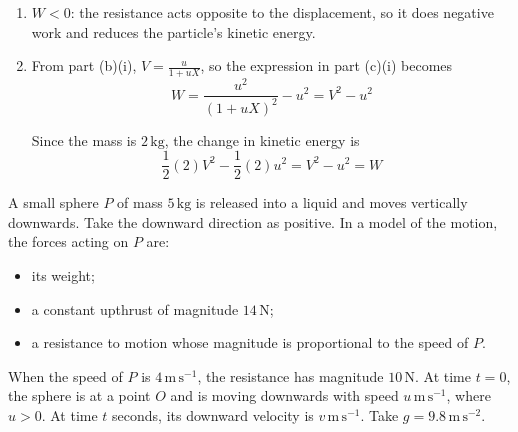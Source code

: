 \documentclass[leqno]{article}
\begin{document}
\begin{enumerate}[
  label=\textbf{\arabic*.},
  leftmargin=*,
  topsep=0pt,
  partopsep=0pt,
  parsep=0pt
]
\begin{djsSolution}
\begin{enumerate}[label=\textbf{(\alph*)}, start=1]
\begin{enumerate}[label=(\roman*), start=1]
    \item \(W<0\): the resistance acts opposite to the displacement, so it does negative work and reduces the particle's kinetic energy.

    \item From part (b)(i), \(V=\frac{u}{1+uX}\), so the expression in part (c)(i) becomes
    \[
    W=\frac{u^2}{(1+uX)^2}-u^2=V^2-u^2
    \]

    Since the mass is \(2\,\mathrm{kg}\), the change in kinetic energy is
    \[
    \frac12(2)V^2-\frac12(2)u^2=V^2-u^2=W
    \]
  \end{enumerate}
\end{enumerate}
\end{djsSolution}

\newpage

\questionitem

A small sphere $P$ of mass $5\,\mathrm{kg}$ is released into a liquid and moves vertically downwards. Take the downward direction as positive. In a model of the motion, the forces acting on $P$ are: \\

\begin{itemize}
  \item its weight;
  \item a constant upthrust of magnitude $14\,\mathrm{N}$;
  \item a resistance to motion whose magnitude is proportional to the speed of $P$.
\end{itemize}

When the speed of $P$ is $4\,\mathrm{m\,s^{-1}}$, the resistance has magnitude $10\,\mathrm{N}$. At time $t=0$, the sphere is at a point $O$ and is moving downwards with speed $u\,\mathrm{m\,s^{-1}}$, where $u>0$. At time $t$ seconds, its downward velocity is $v\,\mathrm{m\,s^{-1}}$. Take $g=9.8\,\mathrm{m\,s^{-2}}$. \\


\end{enumerate}
\end{document}
